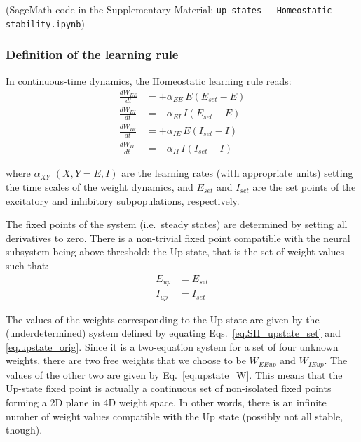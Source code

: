 \documentclass[
twocolumn,
]{article}
\newcommand{\EE}{\mathit{EE}}
\newcommand{\EI}{\mathit{EI}}
\newcommand{\IE}{\mathit{IE}}
\newcommand{\II}{\mathit{II}}
\newcommand{\XY}{\mathit{XY}}
\newcommand{\set}{\mathit{set}}
\newcommand{\up}{\mathit{up}}
\begin{document}
(SageMath code in the Supplementary Material: {\tt up states - Homeostatic stability.ipynb})


\subsubsection{Definition of the learning rule}

In continuous-time dynamics, the Homeostatic learning rule reads:
\begin{equation}
\begin{aligned}
\frac{dW_{\EE}}{dt} & = +\alpha_{\EE} \, E (E_{\set} - E) \\
\frac{dW_{\EI}}{dt} & = -\alpha_{\EI} \, I (E_{\set} - E) \\
\frac{dW_{\IE}}{dt} & = +\alpha_{\IE} \, E (I_{\set} - I) \\
\frac{dW_{\II}}{dt} & = -\alpha_{\II} \, I (I_{\set} - I)
\end{aligned}
\label{eq.SH_equation}
\end{equation}

\noindent where $\alpha_{\XY}$ $(X,Y=E,I)$ are the learning rates (with appropriate units) setting the time scales of the weight dynamics, and $E_{\set}$ and $I_{\set}$ are the set points of the excitatory and inhibitory subpopulations, respectively.

The fixed points of the system (i.e.\ steady states) are determined by setting all derivatives to zero. There is a non-trivial fixed point compatible with the neural subsystem being above threshold: the Up state, that is the set of weight values such that:
\begin{equation}
\begin{aligned}
E_{\up} & = E_{\set} \\
I_{\up} & = I_{\set}
\end{aligned}
\label{eq.SH_upstate_set}
\end{equation}

\noindent The values of the weights corresponding to the Up state are given by the (underdetermined) system defined by equating Eqs.\ \ref{eq.SH_upstate_set} and \ref{eq.upstate_orig}. Since it is a two-equation system for a set of four unknown weights, there are two free weights that we choose to be $W_{\EE\up}$ and $W_{\IE\up}$. The values of the other two are given by Eq.\ \ref{eq.upstate_W}. This means that the Up-state fixed point is actually a continuous set of non-isolated fixed points forming a 2D plane in 4D weight space. In other words, there is an infinite number of weight values compatible with the Up state (possibly not all stable, though).
\end{document}
